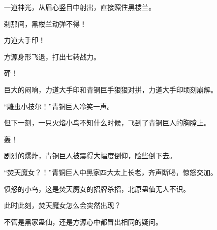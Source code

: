 \begin{this_body}
一道神光，从眉心竖目中射出，直接照住黑楼兰。

刹那间，黑楼兰动弹不得！

力道大手印！

方源身形飞退，打出七转战力。

砰！

巨大的闷响，力道大手印和青铜巨手狠狠对拼，力道大手印顷刻崩解。

“雕虫小技尔！”青铜巨人冷笑一声。

但下一刻，一只火焰小鸟不知什么时候，飞到了青铜巨人的胸膛上。

轰！

剧烈的爆炸，青铜巨人被震得大幅度倒仰，险些倒下去。

“焚天魔女？！”青铜巨人中黑家四大太上长老，齐声断喝，惊怒交加。

愤怒的小鸟，这是焚天魔女的招牌杀招，北原蛊仙无人不识。

此时此刻，焚天魔女怎么会突然出现？

不管是黑家蛊仙，还是方源心中都冒出相同的疑问。

\end{this_body}


